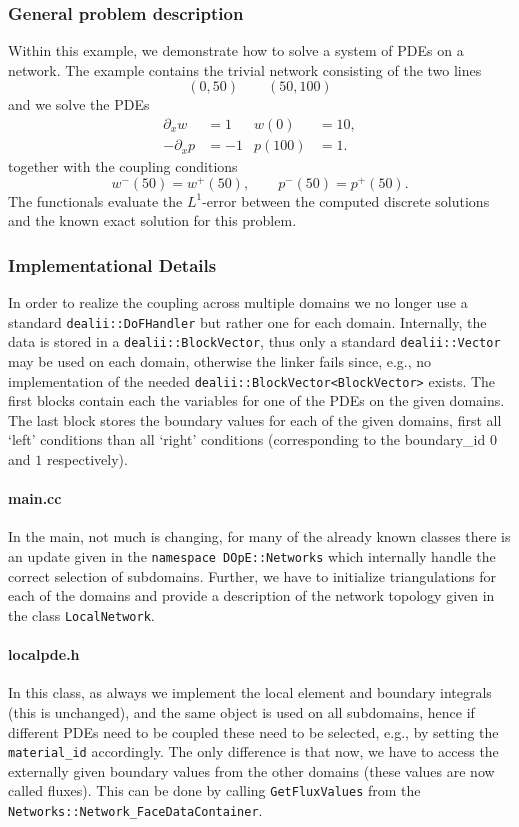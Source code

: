 \subsubsection{General problem description}
Within this example, we demonstrate how to solve a system of PDEs on a
network.
The example contains the trivial network consisting of the two lines 
\[
(0,50) \qquad (50,100)
\]
and we solve the PDEs 
\begin{align*}
  \partial_x w &= 1& w(0)&=10,\\
  -\partial_x p &= -1& p(100)&=1.
\end{align*}
together with the coupling conditions 
\[
w^-(50) = w^+(50),\qquad p^-(50) = p^+(50).
\]
The functionals evaluate the $L^1$-error between the computed discrete
solutions and the known exact solution for this problem.

\subsubsection{Implementational Details}
In order to realize the coupling across multiple domains we no longer
use a standard \texttt{dealii::DoFHandler} but rather one for each
domain. Internally, the data is stored in a
\texttt{dealii::BlockVector}, thus only a standard
\texttt{dealii::Vector} may be used on each domain, otherwise the
linker fails since, e.g., no implementation of the needed 
\texttt{dealii::BlockVector<BlockVector>} exists.
The first blocks contain each the variables for one of the PDEs on the
given domains. The last block stores the boundary values for each of
the given domains, first all `left' conditions than all `right'
conditions (corresponding to the boundary\_id $0$ and $1$
respectively).

\paragraph{main.cc}
In the main, not much is changing, for many of the already known
classes there is an update given in the \texttt{namespace
  DOpE::Networks} which internally handle the correct selection of
subdomains.
Further, we have to initialize triangulations for each of the domains
and provide a description of the network topology given in the class \texttt{LocalNetwork}.

\paragraph{localpde.h}
In this class, as always we implement the local element and boundary
integrals (this is unchanged), and the same object is used on all
subdomains, hence if different PDEs need to be coupled these need to
be selected, e.g., by setting the \texttt{material\_id} accordingly.
The only difference is that now, we have to access the externally
given boundary values from the other domains (these values are 
now called fluxes). This can be done by
calling \texttt{GetFluxValues} from 
the \texttt{Networks::Network\_FaceDataContainer}.

